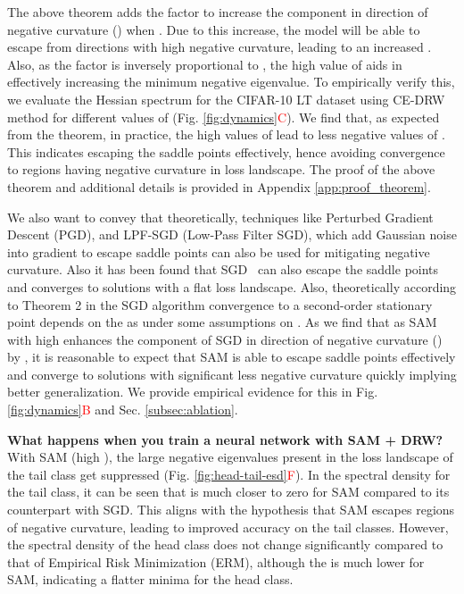\documentclass{article}
\begin{document}
\begin{remark}
The above theorem adds the factor  to increase the component in direction of negative curvature () when . Due to this increase, the model will be able to escape from directions with high negative curvature, leading to an increased . Also, as the factor  is inversely proportional to , the high value of  aids in effectively increasing the minimum negative eigenvalue. To empirically verify this, we evaluate the Hessian spectrum for the CIFAR-10 LT dataset using CE-DRW method for different values of  (Fig. \ref{fig:dynamics}\textcolor{red}{C}). We find that, as expected from the theorem, in practice, the high values of  lead to less negative values of . This indicates escaping the saddle points effectively, hence avoiding convergence to regions having negative curvature in loss landscape. The proof of the above theorem and additional details is provided in Appendix \ref{app:proof_theorem}.

\vspace{1mm} \noindent    We also want to convey that theoretically, techniques like Perturbed Gradient Descent (PGD), and LPF-SGD (Low-Pass Filter SGD), which add Gaussian noise into gradient to escape saddle points can also be used for mitigating negative curvature. Also it has been found that SGD~\cite{daneshmand2018escaping} can also escape the saddle points and converges to solutions with a flat loss landscape. Also, theoretically according to Theorem 2 in \citet{daneshmand2018escaping} the SGD algorithm convergence to a second-order stationary point depends on the  as  under some assumptions on . 
As we find that as SAM with high  enhances the component of SGD in direction of negative curvature () by , it is reasonable to expect that SAM is able to escape saddle points effectively and converge to solutions with significant less negative curvature quickly implying better generalization. We provide empirical evidence for this in Fig. \ref{fig:dynamics}\textcolor{red}{B} and Sec. \ref{subsec:ablation}.
\end{remark}
 \textbf{What happens when you train a neural network with SAM + DRW?}
With SAM (high ), the large negative eigenvalues present in the loss landscape of the tail class get suppressed (Fig. \ref{fig:head-tail-esd}\textcolor{red}{F}). In the spectral density for the tail class, it can be seen that  is much closer to zero for SAM compared to its counterpart with SGD. This aligns with the hypothesis that SAM escapes regions of negative curvature, leading to improved accuracy on the tail classes. However, the spectral density of the head class does not change significantly compared to that of Empirical Risk Minimization (ERM), although the  is much lower for SAM, indicating a flatter minima for the head class.  
\end{document}

